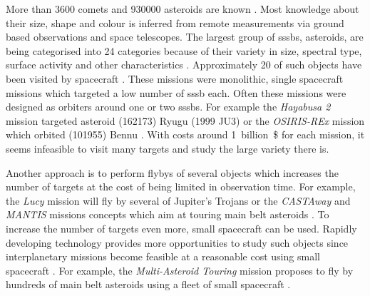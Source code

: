 More than \SI{3600}{} comets and \SI{930000}{} asteroids are known \cite{nasaSBD_count, mpc2020}. Most knowledge about their size, shape and colour is inferred from remote measurements via ground based observations and space telescopes. The largest group of \glspl{sssb}, asteroids, are being categorised into \SI{24}{} categories because of their variety in size, spectral type, surface activity and other characteristics \cite{demeo2009extension}. Approximately \SI{20}{} of such objects have been visited by spacecraft \cite{nasaSBD_missions}. These missions were monolithic, single spacecraft missions which targeted a low number of \gls{sssb} each. Often these missions were designed as orbiters around one or two \glspl{sssb}. For example the \textit{Hayabusa 2} mission targeted asteroid (162173) Ryugu (1999 JU3) or the \textit{OSIRIS-REx} mission which orbited (101955) Bennu \cite{Watanabe2017Hayabusa2Overview, lauretta2017osiris}. With costs around 1~billion~\$ for each mission, it seems infeasible to visit many targets and study the large variety there is.

Another approach is to perform flybys of several objects which increases the number of targets at the cost of being limited in observation time. For example, the \textit{Lucy} mission will fly by several of Jupiter's Trojans \cite{stanbridge2017lucy} or the \textit{CASTAway} and \textit{MANTIS} missions concepts which aim at touring main belt asteroids \cite{bowles2018castaway, rivkin2016mainmantis}. To increase the number of targets even more, small spacecraft can be used. Rapidly developing technology provides more opportunities to study such objects since interplanetary missions become feasible at a reasonable cost using small spacecraft \cite{Poghosyan2017CubeSatMissions, andrews2019asteroid, snodgrass2019europeanCI}. For example, the \textit{Multi-Asteroid Touring} mission proposes to fly by hundreds of main belt asteroids using a fleet of small spacecraft \cite{Slavinskis2018NanospacecraftSails}.


